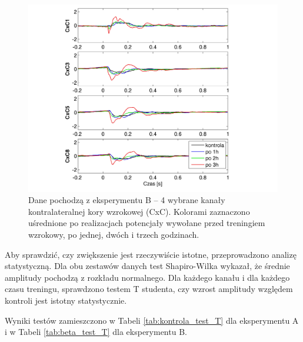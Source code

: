 \documentclass{pracamgr_2}
\begin{document}
\begin{figure}[h]
	\begin{center}
		\includegraphics[scale=0.8]{beta3_CxC.png}
	\end{center}
	\caption{Dane pochodzą z eksperymentu B -- 4 wybrane kanały kontralateralnej kory wzrokowej (CxC). Kolorami zaznaczono uśrednione po realizacjach potencjały wywołane przed treningiem wzrokowy, po jednej, dwóch i trzech godzinach.}
	\label{rys:beta3_CxC}
\end{figure}
\FloatBarrier Aby sprawdzić, czy zwiększenie jest rzeczywiście istotne, przeprowadzono analizę statystyczną. Dla obu zestawów danych test Shapiro-Wilka wykazał, że średnie amplitudy pochodzą z rozkładu normalnego. Dla każdego kanału i dla każdego czasu treningu, sprawdzono testem T studenta, czy wzrost amplitudy względem kontroli jest istotny statystycznie.

Wyniki testów zamieszczono w Tabeli \ref{tab:kontrola_test_T} dla eksperymentu A i w Tabeli \ref{tab:beta_test_T} dla eksperymentu B.
\end{document}
